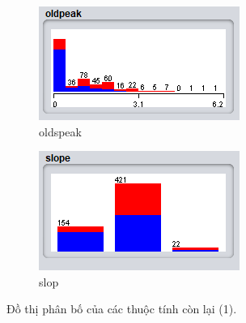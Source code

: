 \begin{figure}[H]
\medskip
\begin{subfigure}{0.38\textwidth}
  \includegraphics[width=\linewidth]{2/12.png}
  \caption{oldspeak}
  \label{fig:4}
\end{subfigure}\hfil %
\begin{subfigure}{0.38\textwidth}
  \includegraphics[width=\linewidth]{2/13.png}
  \caption{slop}
  \label{fig:6}
\end{subfigure}

\caption{Đồ thị phân bố của các thuộc tính còn lại (1).}
\label{fig:images}
\end{figure}

